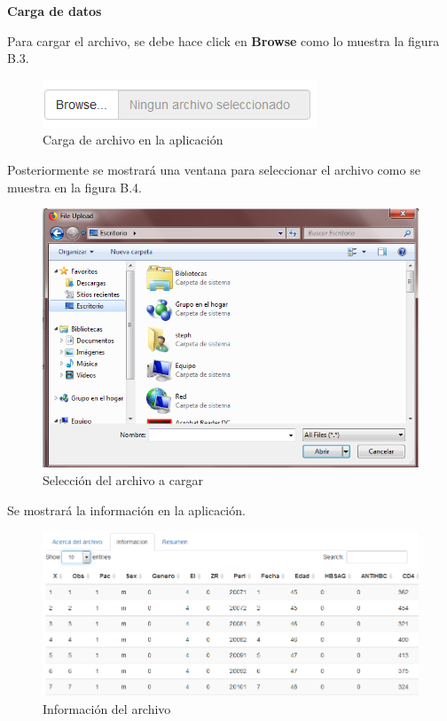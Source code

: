  \noindent
\textbf{Carga de datos}

Para cargar el archivo, se debe hace click en \textbf{Browse} como lo muestra la figura B.3.

\begin{figure}[H]
\centering
\includegraphics[scale=0.8]{browse.PNG}
\caption{Carga de archivo en la aplicaci\'on}
\end{figure}

Posteriormente se mostrar\'a una ventana para seleccionar el archivo como se muestra en la figura B.4.

\begin{figure}[H]
\centering
\includegraphics[scale=0.5]{fileup.PNG}
\caption{Selecci\'on del archivo a cargar}
\end{figure}

Se mostrar\'a la informaci\'on en la aplicaci\'on.

\begin{figure}[H]
\centering
\includegraphics[scale=0.6]{Cargafile2.PNG}
\caption{Informaci\'on del archivo}
\end{figure}


